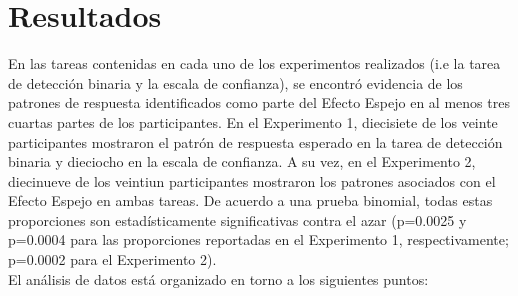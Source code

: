 
\chapter{Resultados} %

\label{Cap_Res} %

En las tareas contenidas en cada uno de los experimentos realizados (i.e la tarea de detección binaria y la escala de confianza), se encontró evidencia de los patrones de respuesta identificados como parte del Efecto Espejo en al menos tres cuartas partes de los participantes. En el Experimento 1, diecisiete de los veinte participantes mostraron el patrón de respuesta esperado en la tarea de detección binaria y dieciocho en la escala de confianza. A su vez, en el Experimento 2, diecinueve de los veintiun participantes mostraron los patrones asociados con el Efecto Espejo en ambas tareas. De acuerdo a una prueba binomial, todas estas proporciones son estadísticamente significativas contra el azar (p=0.0025 y p=0.0004 para las proporciones reportadas en el Experimento 1, respectivamente; p=0.0002 para el Experimento 2).\\





El análisis de datos está organizado en torno a los siguientes puntos:

